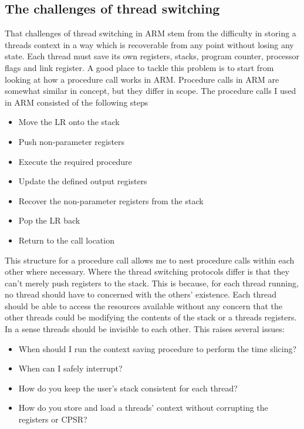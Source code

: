 \subsection{The challenges of thread switching}
\label{chap:Threading}
That challenges of thread switching in ARM stem from the difficulty in storing a threads context in a way which is recoverable from any point without losing any state. Each thread must save its own registers, stacks, program counter, processor flags and link register. A good place to tackle this problem is to start from looking at how a procedure call works in ARM. Procedure calls in ARM are somewhat similar in concept, but they differ in scope. The procedure calls \cite{arm_man} I used in ARM consisted of the following steps
\begin{itemize}
	\item Move the LR onto the stack 
	\item Push non-parameter registers
	\item Execute the required procedure
	\item Update the defined output registers
	\item Recover the non-parameter registers from the stack
	\item Pop the LR back
	\item Return to the call location
\end{itemize} %
This structure for a procedure call allows me to nest procedure calls within each other where necessary. Where the thread switching protocols differ is that they can't merely push registers to the stack. This is because, for each thread running, no thread should have to concerned with the others' existence. Each thread should be able to access the resources available without any concern that the other threads could be modifying the contents of the stack or a threads registers. In a sense threads should be invisible to each other. This raises several issues:
\begin{itemize}
	\item When should I run the context saving procedure to perform the time slicing?
	\item When can I safely interrupt?
	\item How do you keep the user's stack consistent for each thread?
	\item How do you store and load a threads' context without corrupting the registers or CPSR?
\end{itemize}
